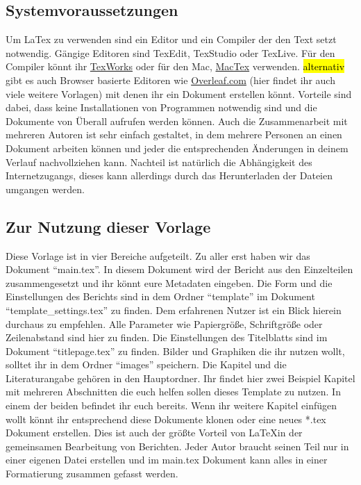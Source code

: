  	
\subsection{Systemvoraussetzungen} %
\label{subsec:Systemvoraustestungen}

Um LaTex zu verwenden sind ein Editor   %
und ein Compiler der den Text setzt notwendig. Gängige Editoren sind TexEdit, TexStudio oder TexLive. Für den Compiler könnt ihr  \href{https://www.tug.org/texworks/}{TexWorks} oder für den Mac, \href{https://tug.org/mactex/}{MacTex} verwenden. \hl{alternativ} %
gibt es auch Browser basierte Editoren wie \href{https://www.overleaf.com}{Overleaf.com} (hier findet ihr auch viele weitere Vorlagen) mit denen ihr ein Dokument erstellen könnt. Vorteile sind dabei, dass keine Installationen von Programmen notwendig sind und die Dokumente von Überall aufrufen werden können. Auch die Zusammenarbeit mit mehreren Autoren ist sehr einfach gestaltet, in dem mehrere Personen an einen Dokument arbeiten können und jeder die entsprechenden Änderungen in deinem Verlauf nachvollziehen kann. Nachteil ist natürlich die Abhängigkeit des Internetzugangs, dieses kann allerdings durch das Herunterladen der Dateien umgangen werden. 


\subsection{Zur Nutzung dieser Vorlage}
\label{subsec:ZurNutzungDiesesTemplates}

Diese Vorlage ist in vier Bereiche aufgeteilt. Zu aller erst haben wir das Dokument \enquote{main.tex}. In diesem Dokument wird der Bericht aus den Einzelteilen zusammengesetzt und ihr könnt eure Metadaten eingeben. Die Form und die Einstellungen des Berichts sind in dem Ordner \enquote{template} im Dokument \enquote{template\_settings.tex} zu finden. Dem erfahrenen Nutzer ist ein Blick hierein durchaus zu empfehlen. Alle Parameter wie Papiergröße, Schriftgröße oder Zeilenabstand sind hier zu finden. Die Einstellungen des Titelblatts sind im Dokument \enquote{titlepage.tex} zu finden. Bilder und Graphiken die ihr nutzen wollt, solltet ihr in dem Ordner \enquote{images} speichern. Die Kapitel und die Literaturangabe gehören in den Hauptordner. Ihr findet hier zwei Beispiel Kapitel mit mehreren Abschnitten die euch helfen sollen dieses Template zu nutzen. In einem der beiden befindet ihr euch bereits. Wenn ihr weitere Kapitel einfügen wollt könnt ihr entsprechend diese Dokumente klonen oder eine neues *.tex Dokument erstellen. Dies ist auch der größte Vorteil von \LaTeX in der gemeinsamen Bearbeitung von Berichten. Jeder Autor braucht seinen Teil nur in einer eigenen Datei erstellen und im main.tex Dokument kann alles in einer Formatierung zusammen gefasst werden. 

